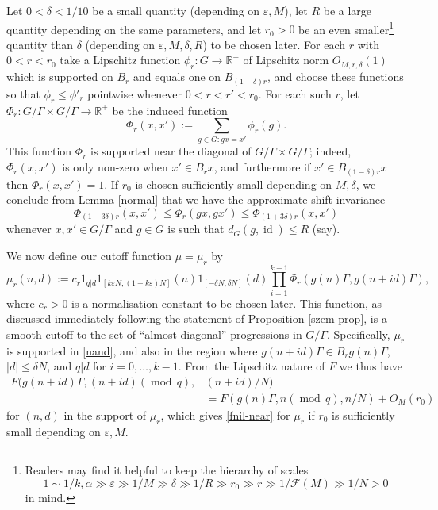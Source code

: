 \documentclass[11pt,reqno]{amsart}
\numberwithin{equation}{section}
\theoremstyle{plain}
\theoremstyle{definition}
\renewcommand{\leq}{\leqslant}
\newcommand{\md}[1]{\ensuremath{(\operatorname{mod}\, #1)}}
\newcommand\R{\mathbb{R}}
\newcommand\1{{\bf 1}}
\newcommand\2{{\bf 2}}
\newcommand\eps{\varepsilon}
\newcommand\id{\operatorname{id}}
\newcommand\Grow{{\mathcal F}}
\begin{document}
Let $0 < \delta < 1/10$ be a small quantity (depending on $\eps, M$), let $R$ be a large quantity depending on the same parameters, and let $r_0 > 0$ be an even smaller\footnote{Readers may find it helpful to keep the hierarchy of scales 
$$ 1 \sim 1/k, \alpha \gg \eps \gg 1/M \gg \delta \gg 1/R \gg r_0 \gg r \gg 1/\Grow(M) \gg 1/N > 0$$
in mind.
}  quantity than $\delta$ (depending on $\eps, M, \delta,R$) to be chosen later.  For each $r$ with $0 < r < r_0$ take a Lipschitz function $\phi_r: G \to \R^+$ of Lipschitz norm $O_{M,r,\delta}(1)$ which is supported on $B_{r}$ and equals one on $B_{(1-\delta) r}$, and choose these functions so that $\phi_{r} \leq \phi'_r$ pointwise whenever $ 0 < r < r' < r_0$. For each such $r$, let $\Phi_r: G/\Gamma \times G/\Gamma \to \R^+$ be the induced function
$$ \Phi_r(x, x') := \sum_{g \in G: gx = x'} \phi_r(g).$$
This function $\Phi_r$ is supported near the diagonal of $G/\Gamma \times G/\Gamma$; indeed, $\Phi_r(x,x')$ is only non-zero when $x' \in B_r x$, and furthermore if $x' \in B_{(1-\delta)r} x$ then $\Phi_r(x,x') = 1$.  If $r_0$ is chosen sufficiently small depending on $M,\delta$, we conclude from Lemma \ref{normal} that we have the approximate shift-invariance
\begin{equation}\label{phoi}
\Phi_{(1-3\delta)r}(x,x') \leq \Phi_r( gx, gx' ) \leq \Phi_{(1+3\delta) r}(x, x')
\end{equation}
whenever $x,x' \in G/\Gamma$ and $g \in G$ is such that $d_G(g,\id) \leq R$ (say).

We now define our cutoff function $\mu = \mu_r$ by
\begin{equation}\label{monkey}
\mu_r(n,d) := c_r 1_{q|d} 1_{[k\eps N, (1-k\eps) N]}(n) 1_{[-\delta N,\delta N]}(d) \prod_{i=1}^{k-1} \Phi_r( g(n) \Gamma, g(n+id)\Gamma ),
\end{equation}
where $c_r>0$ is a normalisation constant to be chosen later. This function, as discussed immediately following the statement of Proposition \ref{szem-prop}, is a smooth cutoff to the set of ``almost-diagonal'' progressions in $G/\Gamma$. Specifically, $\mu_r$ is supported in \eqref{nand}, and also in the region where $g(n+id) \Gamma \in B_{r} g(n) \Gamma$, $|d| \leq \delta N$, and $q|d$ for $i=0,\ldots,k-1$.  From the Lipschitz nature of $F$ we thus have
\begin{align*} F( g(n+id) \Gamma,  (n+id) \md{q}, & (n+id)/N ) \\ & = F(g(n) \Gamma, n \md{q}, n/N ) + O_{M}(r_0)\end{align*}
for $(n,d)$ in the support of $\mu_r$, which gives \eqref{fnil-near} for $\mu_r$ if $r_0$ is sufficiently small depending on $\eps, M$.
\end{document}
